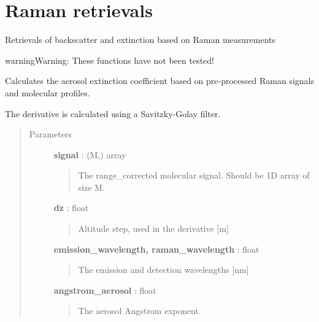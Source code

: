 \documentclass[letterpaper,10pt,english]{sphinxmanual}
\begin{document}
\chapter{Raman retrievals}
\label{raman:raman-retrievals}\label{raman::doc}\label{raman:module-raman_retrievals}
Retrievals of backscatter and extinction based on Raman measurements

\begin{notice}{warning}{Warning:}
These functions have not been tested!
\end{notice}

\begin{fulllineitems}
\label{raman:raman_retrievals.raman_extinction}
Calculates the aerosol extinction coefficient based on pre-processed Raman signals and molecular profiles.

The derivative is calculated using a Savitzky-Golay filter.
\begin{quote}\begin{description}
\item[{Parameters}] \leavevmode
\textbf{signal} : (M,) array
\begin{quote}

The range\_corrected molecular signal. Should be 1D array of size M.
\end{quote}

\textbf{dz} : float
\begin{quote}

Altitude step, used in the derivative {[}m{]}
\end{quote}

\textbf{emission\_wavelength, raman\_wavelength} : float
\begin{quote}

The emission and detection wavelengths {[}nm{]}
\end{quote}

\textbf{angstrom\_aerosol} : float
\begin{quote}

The aerosol Angstrom exponent.
\end{quote}


\end{description}
\end{quote}
\end{fulllineitems}
\end{document}
